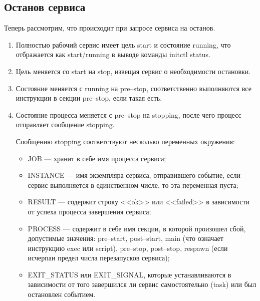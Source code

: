 \subsection*{Останов сервиса}
Теперь рассмотрим, что происходит при запросе сервиса на останов. \begin{enumerate}
\item Полностью рабочий сервис имеет цель start и состояние running, что отбражается как start/running в выводе команды initctl status.
\item Цель меняется со start на stop, извещая сервис о необходимости остановки.
\item Состояние меняется с running на pre--stop, соответственно выполняются все инструкции в секции pre--stop, если такая есть.
\item Состояние процесса меняется с pre--stop на stopping, после чего процесс отправляет сообщение stopping.

Сообщению stopping соответствуют несколько переменных окружения: \begin{itemize} 
\item JOB --- хранит в себе имя процесса сервиса; 
\item INSTANCE --- имя экземпляра сервиса, отправившего событие, если сервис выполняется в единственном числе, то эта переменная пуста; 
\item RESULT --- содержит строку <<ok>> или <<failed>> в зависимости от успеха процесса завершения сервиса; 
\item PROCESS --- содержит в себе имя секции, в которой произошел сбой, допустимые значения: pre--start, post--start, main (что означает инструкцию exec или script), pre--stop, post--stop, respawn (если исчерпан предел числа перезапусков сервиса); 
\item EXIT\_STATUS или EXIT\_SIGNAL, которые устанавливаются в зависимости от того завершился ли сервис самостоятельно (task) или был остановлен событием.  
\end{itemize}
\end{enumerate}